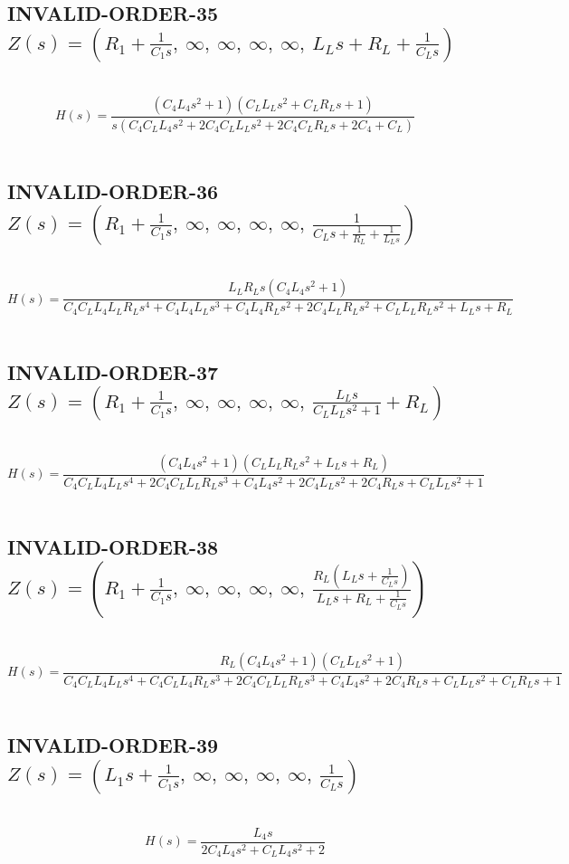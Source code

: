 \documentclass{article}
\begin{document}
\subsection{INVALID-ORDER-35 $Z(s) = \left( R_{1} + \frac{1}{C_{1} s}, \  \infty, \  \infty, \  \infty, \  \infty, \  L_{L} s + R_{L} + \frac{1}{C_{L} s}\right)$ } \ 
\textbf{\[H(s) = \frac{\left(C_{4} L_{4} s^{2} + 1\right) \left(C_{L} L_{L} s^{2} + C_{L} R_{L} s + 1\right)}{s \left(C_{4} C_{L} L_{4} s^{2} + 2 C_{4} C_{L} L_{L} s^{2} + 2 C_{4} C_{L} R_{L} s + 2 C_{4} + C_{L}\right)}\] } \ 
\subsection{INVALID-ORDER-36 $Z(s) = \left( R_{1} + \frac{1}{C_{1} s}, \  \infty, \  \infty, \  \infty, \  \infty, \  \frac{1}{C_{L} s + \frac{1}{R_{L}} + \frac{1}{L_{L} s}}\right)$ } \ 
\textbf{\[H(s) = \frac{L_{L} R_{L} s \left(C_{4} L_{4} s^{2} + 1\right)}{C_{4} C_{L} L_{4} L_{L} R_{L} s^{4} + C_{4} L_{4} L_{L} s^{3} + C_{4} L_{4} R_{L} s^{2} + 2 C_{4} L_{L} R_{L} s^{2} + C_{L} L_{L} R_{L} s^{2} + L_{L} s + R_{L}}\] } \ 
\subsection{INVALID-ORDER-37 $Z(s) = \left( R_{1} + \frac{1}{C_{1} s}, \  \infty, \  \infty, \  \infty, \  \infty, \  \frac{L_{L} s}{C_{L} L_{L} s^{2} + 1} + R_{L}\right)$ } \ 
\textbf{\[H(s) = \frac{\left(C_{4} L_{4} s^{2} + 1\right) \left(C_{L} L_{L} R_{L} s^{2} + L_{L} s + R_{L}\right)}{C_{4} C_{L} L_{4} L_{L} s^{4} + 2 C_{4} C_{L} L_{L} R_{L} s^{3} + C_{4} L_{4} s^{2} + 2 C_{4} L_{L} s^{2} + 2 C_{4} R_{L} s + C_{L} L_{L} s^{2} + 1}\] } \ 
\subsection{INVALID-ORDER-38 $Z(s) = \left( R_{1} + \frac{1}{C_{1} s}, \  \infty, \  \infty, \  \infty, \  \infty, \  \frac{R_{L} \left(L_{L} s + \frac{1}{C_{L} s}\right)}{L_{L} s + R_{L} + \frac{1}{C_{L} s}}\right)$ } \ 
\textbf{\[H(s) = \frac{R_{L} \left(C_{4} L_{4} s^{2} + 1\right) \left(C_{L} L_{L} s^{2} + 1\right)}{C_{4} C_{L} L_{4} L_{L} s^{4} + C_{4} C_{L} L_{4} R_{L} s^{3} + 2 C_{4} C_{L} L_{L} R_{L} s^{3} + C_{4} L_{4} s^{2} + 2 C_{4} R_{L} s + C_{L} L_{L} s^{2} + C_{L} R_{L} s + 1}\] } \ 
\subsection{INVALID-ORDER-39 $Z(s) = \left( L_{1} s + \frac{1}{C_{1} s}, \  \infty, \  \infty, \  \infty, \  \infty, \  \frac{1}{C_{L} s}\right)$ } \ 
\textbf{\[H(s) = \frac{L_{4} s}{2 C_{4} L_{4} s^{2} + C_{L} L_{4} s^{2} + 2}\] } \ 
\end{document}
